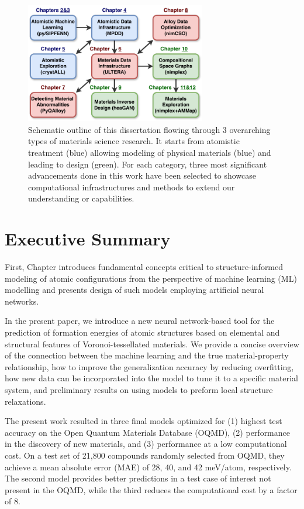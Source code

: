 \begin{figure}[H]
    \centering
    \includegraphics[width=0.7\textwidth]{intro/DissertationOutline.pdf}
    \caption{Schematic outline of this dissertation flowing through 3 overarching types of materials science research. It starts from atomistic treatment (blue) allowing modeling of physical materials (blue) and leading to design (green). For each category, three most significant advancements done in this work have been selected to showcase computational infrastructures and methods to extend our understanding or capabilities.}
    \label{intro:fig:outline}
\end{figure}


\section{Executive Summary} \label{intro:sec:summary}

First, Chapter  introduces fundamental concepts critical to structure-informed modeling of atomic configurations from the perspective of machine learning (ML) modelling and presents design of such models employing artificial neural networks.

In the present paper, we introduce a new neural network-based tool for the prediction of formation energies of atomic structures based on elemental and structural features of Voronoi-tessellated materials. We provide a concise overview of the connection between the machine learning and the true material-property relationship, how to improve the generalization accuracy by reducing overfitting, how new data can be incorporated into the model to tune it to a specific material system, and preliminary results on using models to preform local structure relaxations.

The present work resulted in three final models optimized for (1) highest test accuracy on the Open Quantum Materials Database (OQMD), (2) performance in the discovery of new materials, and (3) performance at a low computational cost. On a test set of 21,800 compounds randomly selected from OQMD, they achieve a mean absolute error (MAE) of 28, 40, and 42 meV/atom, respectively. The second model provides better predictions in a test case of interest not present in the OQMD, while the third reduces the computational cost by a factor of 8.

